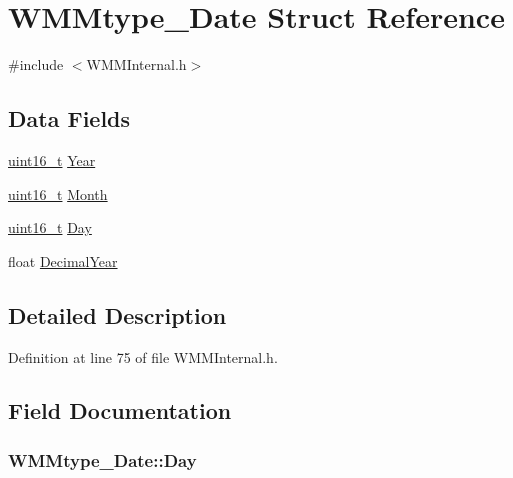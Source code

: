 \hypertarget{struct_w_m_mtype___date}{\section{W\-M\-Mtype\-\_\-\-Date Struct Reference}
\label{struct_w_m_mtype___date}
}


{\ttfamily \#include $<$W\-M\-M\-Internal.\-h$>$}

\subsection*{Data Fields}
\begin{DoxyCompactItemize}
\item 
\hyperlink{stdint_8h_a273cf69d639a59973b6019625df33e30}{uint16\-\_\-t} \hyperlink{struct_w_m_mtype___date_a82ccdb4608f69fe13225f5add055d3ad}{Year}
\item 
\hyperlink{stdint_8h_a273cf69d639a59973b6019625df33e30}{uint16\-\_\-t} \hyperlink{struct_w_m_mtype___date_a7f47a103df8618aac10b109fd5b149c4}{Month}
\item 
\hyperlink{stdint_8h_a273cf69d639a59973b6019625df33e30}{uint16\-\_\-t} \hyperlink{struct_w_m_mtype___date_ae181b3f6292dbe3b6f89e412c977b1e1}{Day}
\item 
float \hyperlink{struct_w_m_mtype___date_a68078d5d0181333dcf11e24171a218f2}{Decimal\-Year}
\end{DoxyCompactItemize}


\subsection{Detailed Description}


Definition at line 75 of file W\-M\-M\-Internal.\-h.



\subsection{Field Documentation}
\hypertarget{struct_w_m_mtype___date_ae181b3f6292dbe3b6f89e412c977b1e1}{
\subsubsection[{Day}]{ W\-M\-Mtype\-\_\-\-Date\-::\-Day}}\label{struct_w_m_mtype___date_ae181b3f6292dbe3b6f89e412c977b1e1}



